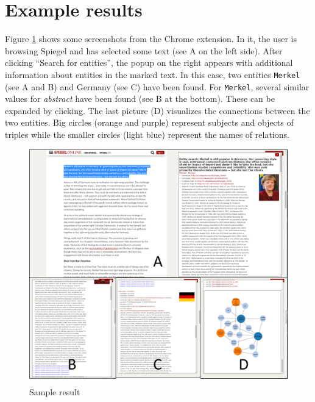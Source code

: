 \section{Example results}

Figure \ref{fig:sampleResults} shows some screenshots from the Chrome extension. In it, the user is browsing Spiegel and has selected some text (see A on the left side). After clicking ``Search for entities'', the popup on the right appears with additional information about entities in the marked text. In this case, two entities \texttt{Merkel} (see A and B) and Germany (see C) have been found. For \texttt{Merkel}, several similar values for \textit{abstract} have been found (see B at the bottom). These can be expanded by clicking. The last picture (D) visualizes the connections between the two entities. Big circles (orange and purple) represent subjects and objects of triples while the smaller circles (light blue) represent the names of relations. 



\begin{figure}[H]
	\centering
	\includegraphics[width=1\textwidth]{img/sampleResults/sampleResult}
	\caption{Sample result}
	\label{fig:sampleResults}
\end{figure}






